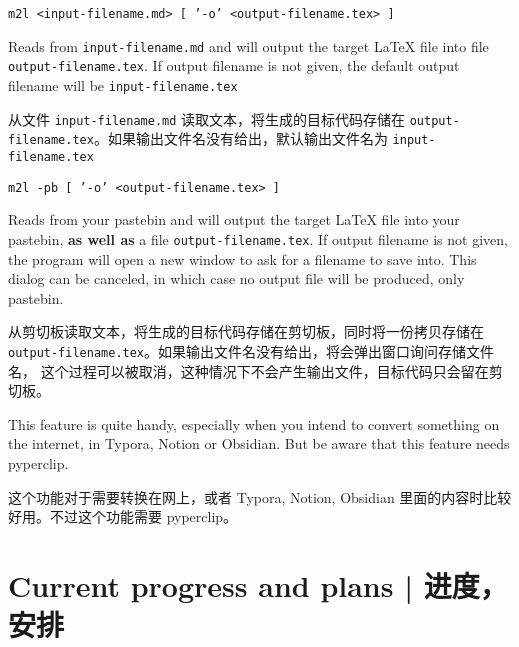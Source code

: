 \documentclass{ctexart}
\begin{document}
	\texttt{m2l <input-filename.md> [ '-o' <output-filename.tex> ]}

	Reads from \texttt{input-filename.md} and will output the target LaTeX file into file \texttt{output-filename.tex}. If output filename is not given, the default output filename will be \texttt{input-filename.tex}

	从文件 \texttt{input-filename.md} 读取文本，将生成的目标代码存储在 \texttt{output-filename.tex}。如果输出文件名没有给出，默认输出文件名为 \texttt{input-filename.tex}

	\texttt{m2l -pb [ '-o' <output-filename.tex> ]}

	Reads from your pastebin and will output the target LaTeX file into your pastebin, \textbf{as well as} a file \texttt{output-filename.tex}. If output filename is not given, the program will open a new window to ask for a filename to save into. This dialog can be canceled, in which case no output file will be produced, only pastebin.

	从剪切板读取文本，将生成的目标代码存储在剪切板，同时将一份拷贝存储在 \texttt{output-filename.tex}。如果输出文件名没有给出，将会弹出窗口询问存储文件名， 这个过程可以被取消，这种情况下不会产生输出文件，目标代码只会留在剪切板。

	This feature is quite handy, especially when you intend to convert something on the internet, in Typora, Notion or Obsidian. But be aware that this feature needs pyperclip.

	这个功能对于需要转换在网上，或者 Typora, Notion, Obsidian 里面的内容时比较好用。不过这个功能需要 pyperclip。

	\section{Current progress and plans | 进度，安排}
\end{document}
